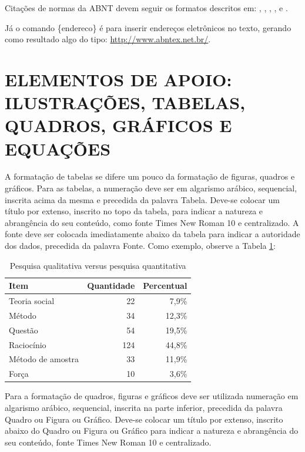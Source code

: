\documentclass{sep}
\begin{document}
Citações de normas da ABNT devem seguir os formatos descritos em: \cite{NBR6022}, \cite{NBR6023}, \cite{NBR6024}, \cite{NBR6028}, \cite{NBR10520} e \cite{NBR14724}.

Já o comando \{endereco\} é para inserir endereços eletrônicos no texto, gerando como resultado algo do tipo: \url{http://www.abntex.net.br/}.

\section{ELEMENTOS DE APOIO: ILUSTRAÇÕES, TABELAS, QUADROS, GRÁFICOS E EQUAÇÕES}

A formatação de tabelas se difere um pouco da formatação de figuras, quadros e gráficos.
Para as tabelas, a numeração deve ser em algarismo arábico, sequencial, inscrita acima da mesma e precedida da palavra Tabela.
Deve-se colocar um título por extenso, inscrito no topo da tabela, para indicar a natureza e abrangência do seu conteúdo, como fonte Times New Roman 10 e centralizado.
A fonte deve ser colocada imediatamente abaixo da tabela para indicar a autoridade dos dados, precedida da palavra Fonte.
Como exemplo, observe a Tabela \ref{tab1}:

\begin{table}[!htb] \centering
\caption{Pesquisa qualitativa versus pesquisa quantitativa} \label{tab1}
  \begin{tabular}{lrr} \hline
  \textbf{Item}     & \textbf{Quantidade} & \textbf{Percentual} \\ \hline
  Teoria social     &  22 &  7,9\% \\
  Método            &  34 & 12,3\% \\
  Questão           &  54 & 19,5\% \\
  Raciocínio        & 124 & 44,8\% \\
  Método de amostra &  33 & 11,9\% \\
  Força             &  10 &  3,6\% \\ \hline
  \end{tabular}
\end{table}

Para a formatação de quadros, figuras e gráficos deve ser utilizada numeração em algarismo arábico, sequencial, inscrita na parte
inferior, precedida da palavra Quadro ou Figura ou Gráfico.
Deve-se colocar um título por extenso, inscrito abaixo do Quadro ou Figura ou Gráfico para indicar a natureza e abrangência do seu conteúdo, fonte Times New Roman 10 e centralizado.
\end{document}
